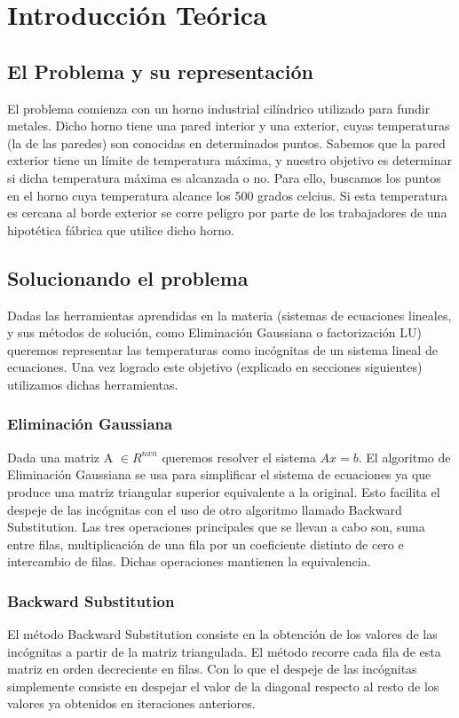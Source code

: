 \section{Introducción Teórica}

\subsection{El Problema y su representación}

El problema comienza con un horno industrial cilíndrico utilizado para fundir metales. Dicho horno tiene una pared interior y una exterior, cuyas temperaturas (la de las paredes) son conocidas en determinados puntos. Sabemos que la pared exterior tiene un límite de temperatura máxima, y nuestro objetivo es determinar si dicha temperatura máxima es alcanzada o no. Para ello, buscamos los puntos en el horno cuya temperatura alcance los 500 grados celcius. Si esta temperatura es cercana al borde exterior se corre peligro por parte de los trabajadores de una hipotética fábrica que utilice dicho horno.\\


\subsection{Solucionando el problema}

Dadas las herramientas aprendidas en la materia (sistemas de ecuaciones lineales, y sus métodos de solución, como Eliminación Gaussiana o factorización LU) queremos representar las temperaturas como incógnitas de un sistema lineal de ecuaciones. Una vez logrado este objetivo (explicado en secciones siguientes) utilizamos dichas herramientas.

\subsubsection{Eliminación Gaussiana}
Dada una matriz A $\in R^{nxn}$ queremos resolver el sistema $Ax = b$. El algoritmo de Eliminación Gaussiana se usa para simplificar el sistema de ecuaciones ya que produce una matriz triangular superior equivalente a la original. Esto facilita el despeje de las incógnitas con el uso de otro algoritmo llamado Backward Substitution. Las tres operaciones principales que se llevan a cabo son, suma entre filas, multiplicación de una fila por un coeficiente distinto de cero e intercambio de filas. Dichas operaciones mantienen la equivalencia.

\subsubsection{Backward Substitution}
El método Backward Substitution consiste en la obtención de los valores de las incógnitas a partir de la matriz triangulada. El método recorre cada fila de esta matriz en orden decreciente en filas. Con lo que el despeje de las incógnitas simplemente consiste en despejar el valor de la diagonal respecto al resto de los valores ya obtenidos en iteraciones anteriores.

